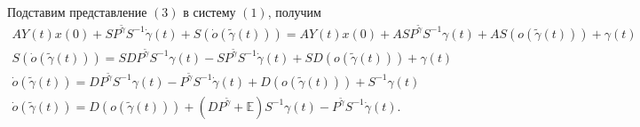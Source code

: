\documentclass[12pt, a4paper]{article}
\begin{document}
\quad Подставим представление $(3)$ в систему $(1)$, получим
\[
\begin{array}{c}
AY(t)x(0) + S P^{\widetilde{\gamma}} S^{-1} \dot{\gamma}(t) + S \left( \dot{o}(\widetilde{\gamma}(t))\right) = AY(t)x(0) + A S P^{\widetilde{\gamma}} S^{-1} \gamma(t) + AS\left( o(\widetilde{\gamma}(t))\right) + \gamma(t)
\\
S \left( \dot{o}(\widetilde{\gamma}(t))\right) = SDP^{\widetilde{\gamma}} S^{-1} \gamma(t) - S P^{\widetilde{\gamma}} S^{-1} \dot{\gamma}(t) + SD\left( o(\widetilde{\gamma}(t))\right) + \gamma(t)
\\
\dot{o}(\widetilde{\gamma}(t)) = DP^{\widetilde{\gamma}} S^{-1} \gamma(t) - P^{\widetilde{\gamma}} S^{-1} \dot{\gamma}(t) + D\left( o(\widetilde{\gamma}(t))\right) + S^{-1} \gamma(t)
\\
\dot{o}(\widetilde{\gamma}(t)) = D\left( o(\widetilde{\gamma}(t))\right) + \left(DP^{\widetilde{\gamma}} + \mathds{E}\right) S^{-1} \gamma(t) - P^{\widetilde{\gamma}} S^{-1} \dot{\gamma}(t).
\end{array}
\]
\end{document}
